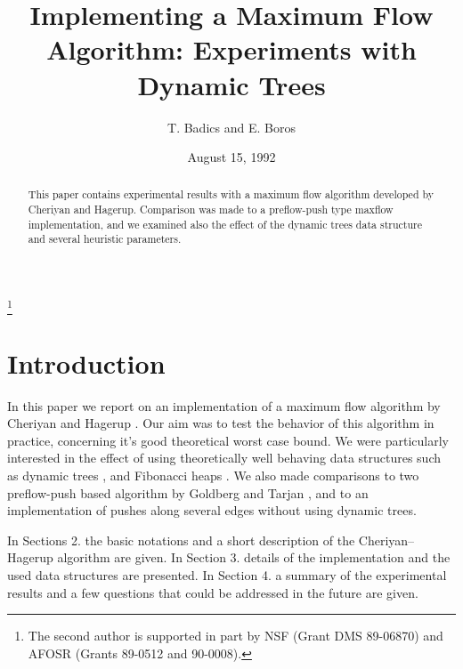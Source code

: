 


\def\JACM{{J.\ ACM }}

\title[IMPLEMENTING A MAXFLOW ALGORITHM]{Implementing a Maximum
Flow Algorithm: Experiments with Dynamic Trees}

\author[T. BADICS AND E. BOROS]{T. Badics and E. Boros}

\address{RUTCOR, Rutgers University, New Brunswick, NJ 08903-5062.}


\date{August 15, 1992}

\thanks{The second author is supported in part
by NSF (Grant DMS 89-06870) and AFOSR (Grants 89-0512 and 90-0008).}

\maketitle

\begin{abstract}
This paper contains experimental results with a maximum
flow algorithm developed by Cheriyan and Hagerup. 
Comparison was made to a preflow-push type maxflow implementation, and
we examined also the effect of the dynamic trees data structure and
several heuristic parameters. 
\end{abstract}

\section{Introduction}
In this paper we report on an implementation of a maximum flow
algorithm by Cheriyan and Hagerup \cite{CH}. Our aim was to test the
behavior of this algorithm in practice, concerning it's good
theoretical worst case bound.  We were particularly interested in
the effect of using theoretically well behaving data structures such
as dynamic trees \cite{ST}, and Fibonacci heaps \cite{FH}. We also
made comparisons to two preflow-push based algorithm by Goldberg and
Tarjan \cite{GT88}, and to an implementation of pushes along several
edges without using dynamic trees. 
 
In Sections 2. the basic notations and 
a short description of the Cheriyan--Hagerup algorithm are given. In
Section 3. details of the implementation and the used data structures
are presented. In Section 4. a summary of the experimental results and
a few questions that could be addressed in the future are given. 

